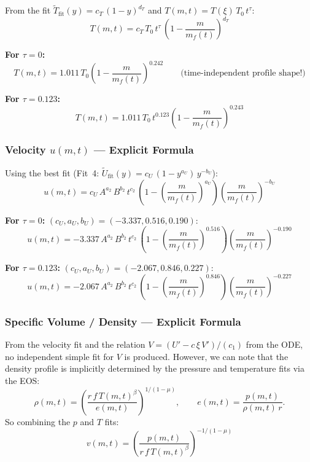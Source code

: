 \documentclass[11pt]{article}
\newcommand{\xsi}{\xi}
\begin{document}
From the fit $\tilde{T}_{\mathrm{fit}}(y) = c_T\,(1-y)^{d_T}$ and $T(m,t) = T(\xsi)\,T_0\,t^{\tau}$:
\begin{equation}
  \boxed{T(m,t) = c_T\,T_0\,t^{\tau}\,\left(1 - \frac{m}{m_f(t)}\right)^{d_T}}
\end{equation}

\textbf{For $\tau=0$:}
\begin{equation}
  T(m,t) = 1.011\,T_0\left(1 - \frac{m}{m_f(t)}\right)^{0.242}
  \qquad\text{(time-independent profile shape!)}
\end{equation}

\textbf{For $\tau=0.123$:}
\begin{equation}
  T(m,t) = 1.011\,T_0\,t^{0.123}\left(1 - \frac{m}{m_f(t)}\right)^{0.243}
\end{equation}

\subsubsection{Velocity $u(m,t)$ --- Explicit Formula}

Using the best fit (Fit~4: $\tilde{U}_{\mathrm{fit}}(y) = c_U\,(1-y^{a_U})\,y^{-b_U}$):
\begin{equation}
  \boxed{u(m,t) = c_U\,A^{a_2}\,B^{b_2}\,t^{c_2}\,
  \left(1 - \left(\frac{m}{m_f(t)}\right)^{a_U}\right)
  \left(\frac{m}{m_f(t)}\right)^{-b_U}}
\end{equation}

\textbf{For $\tau=0$:} $(c_U, a_U, b_U) = (-3.337, 0.516, 0.190)$:
\begin{equation}
  u(m,t) = -3.337\,A^{a_2}\,B^{b_2}\,t^{c_2}\,
  \left(1 - \left(\frac{m}{m_f(t)}\right)^{0.516}\right)
  \left(\frac{m}{m_f(t)}\right)^{-0.190}
\end{equation}

\textbf{For $\tau=0.123$:} $(c_U, a_U, b_U) = (-2.067, 0.846, 0.227)$:
\begin{equation}
  u(m,t) = -2.067\,A^{a_2}\,B^{b_2}\,t^{c_2}\,
  \left(1 - \left(\frac{m}{m_f(t)}\right)^{0.846}\right)
  \left(\frac{m}{m_f(t)}\right)^{-0.227}
\end{equation}

\subsubsection{Specific Volume / Density --- Explicit Formula}

From the velocity fit and the relation $V = (U' - c\,\xsi\,V')/(c_1)$ from the ODE, no independent simple fit for $V$ is produced. However, we can note that the density profile is implicitly determined by the pressure and temperature fits via the EOS:
\begin{equation}
  \rho(m,t) = \left(\frac{r\,f\,T(m,t)^{\beta}}{e(m,t)}\right)^{1/(1-\mu)},
  \qquad e(m,t) = \frac{p(m,t)}{\rho(m,t)\,r}.
\end{equation}
So combining the $p$ and $T$ fits:
\begin{equation}
  \boxed{v(m,t) = \left(\frac{p(m,t)}{r\,f\,T(m,t)^{\beta}}\right)^{-1/(1-\mu)}}
\end{equation}
\end{document}
